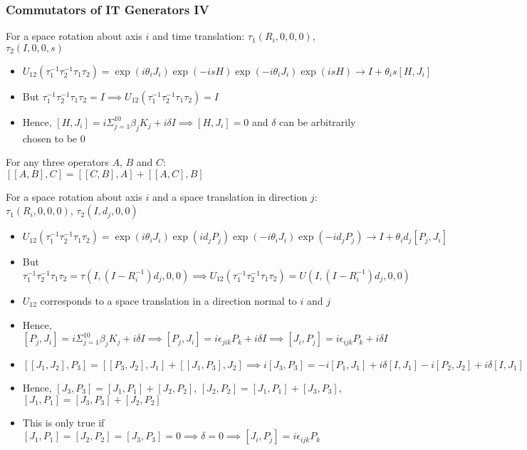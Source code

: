 \documentclass[8pt,t,mathserif,aspectratio=169]{beamer}
\begin{document}
\begin{frame}
  \frametitle{Commutators of IT Generators IV}
  \vspace{1mm}
  For a space rotation about axis $i$ and time translation: $\tau_1(R_i,0,0,0)$, $\tau_2(I,0,0,s)$
  \begin{itemize}
    \item $U_{12}(\tau^{-1}_1 \tau^{-1}_2 \tau_1 \tau_2) = \exp(i \theta_i J_i) \exp(-i s H) \exp(-i \theta_i J_i) \exp(i s H) \to I + \theta_i s [H,J_i]$
    \item But $\tau^{-1}_1 \tau^{-1}_2 \tau_1 \tau_2 = I \implies U_{12}(\tau^{-1}_1 \tau^{-1}_2 \tau_1 \tau_2) = I$
    \item Hence, $[H,J_i] = i \Sigma_{j = 1}^{10} \beta_j K_j + i \delta I \implies [H,J_i] = 0$ and $\delta$ can be arbitrarily chosen to be $0$
  \end{itemize}
  For any three operators $A$, $B$ and $C$: $[[A,B],C] = [[C,B],A] + [[A,C],B]$
  
  For a space rotation about axis $i$ and a space translation in direction $j$: $\tau_1(R_i,0,0,0)$, $\tau_2(I,d_j,0,0)$
  \begin{itemize}
    \item $U_{12}(\tau^{-1}_1 \tau^{-1}_2 \tau_1 \tau_2) = \exp(i \theta_i J_i) \exp(i d_j P_j) \exp(-i \theta_i J_i) \exp(-i d_j P_j) \to I + \theta_i d_j [P_j,J_i]$
    \item But $\tau^{-1}_1 \tau^{-1}_2 \tau_1 \tau_2 = \tau(I,(I - R^{-1}_i)d_j,0,0) \implies U_{12}(\tau^{-1}_1 \tau^{-1}_2 \tau_1 \tau_2) = U(I,(I - R^{-1}_i)d_j,0,0)$
    \item $U_{12}$ corresponds to a space translation in a direction normal to $i$ and $j$ 
    \item Hence, $[P_j,J_i] = i \Sigma_{j = 1}^{10} \beta_j K_j + i \delta I \implies [P_j,J_i] = i \epsilon_{jik} P_k + i \delta I \implies [J_i,P_j] = i \epsilon_{ijk} P_k + i \delta I$
    \item $[[J_1,J_2],P_3] = [[P_3,J_2],J_1] + [[J_1,P_3],J_2] \implies i[J_3,P_3] = -i[P_1,J_1] + i \delta [I,J_1] - i[P_2,J_2] + i \delta [I,J_1]$
    \item Hence, $[J_3,P_3] = [J_1,P_1] + [J_2,P_2]$, $[J_2,P_2] = [J_1,P_1] + [J_3,P_3]$, $[J_1,P_1] = [J_3,P_3] + [J_2,P_2]$
    \item This is only true if $[J_1,P_1] = [J_2,P_2] = [J_3,P_3] = 0 \implies \delta = 0 \implies [J_i,P_j] = i \epsilon_{ijk} P_k$
  \end{itemize}

\end{frame}
\end{document}
